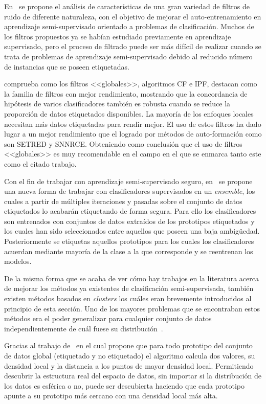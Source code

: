 En~\cite{triguero2014characterization} se propone el análisis de características de una gran variedad de filtros de ruido de diferente naturaleza, con el objetivo de mejorar el auto-entrenamiento en aprendizaje semi-supervisado orientado a problemas de clasificación. Muchos de los filtros propuestos ya se habían estudiado previamente en aprendizaje supervisado, pero el proceso de filtrado puede ser más difícil de realizar cuando se trata de problemas de aprendizaje semi-supervisado debido al reducido número de instancias que se poseen etiquetadas.

\cite{triguero2014characterization} comprueba como los filtros <<globales>>, algoritmos CF e IPF, destacan como la familia de filtros con mejor rendimiento, mostrando que la concordancia de hipótesis de varios clasificadores también es robusta cuando se reduce la proporción de datos etiquetados disponibles. La mayoría de los enfoques locales necesitan más datos etiquetadas para rendir mejor. El uso de estos filtros ha dado lugar a un mejor rendimiento que el logrado por métodos de auto-formación como son SETRED y SNNRCE. Obteniendo como conclusión que el uso de filtros <<globales>> es muy recomendable en el campo en el que se enmarca tanto este como el citado trabajo.

Con el fin de trabajar con aprendizaje semi-supervisado seguro, en~\cite{zhao2021safe} se propone una nueva forma de trabajar con clasificadores supervisados en un \textit{ensemble}, los cuales a partir de múltiples iteraciones y pasadas sobre el conjunto de datos etiquetados lo acabarán etiquetando de forma segura. Para ello los clasificadores son entrenados con conjuntos de datos extraídos de los prototipos etiquetados y los cuales han sido seleccionados entre aquellos que poseen una baja ambigüedad. Posteriormente se etiquetas aquellos prototipos para los cuales los clasificadores acuerdan mediante mayoría de la clase a la que corresponde y se reentrenan los modelos.

De la misma forma que se acaba de ver cómo hay trabajos en la literatura acerca de mejorar los métodos ya existentes de clasificación semi-supervisada, también existen métodos basados en \textit{clusters} los cuáles eran brevemente introducidos al principio de esta sección. Uno de los mayores problemas que se encontraban estos métodos era el poder generalizar para cualquier conjunto de datos independientemente de cuál fuese su distribución~\cite{adankon2011help, gan2013using}.

Gracias al trabajo de~\cite{rodriguez2014clustering} en el cual propone que para todo prototipo del conjunto de datos global (etiquetado y no etiquetado) el algoritmo calcula dos valores, su densidad local y la distancia a los puntos de mayor densidad local. Permitiendo descubrir la estructura real del espacio de datos, sin importar si la distribución de los datos es esférica o no, puede ser descubierta haciendo que cada prototipo apunte a su prototipo más cercano con una densidad local más alta.

